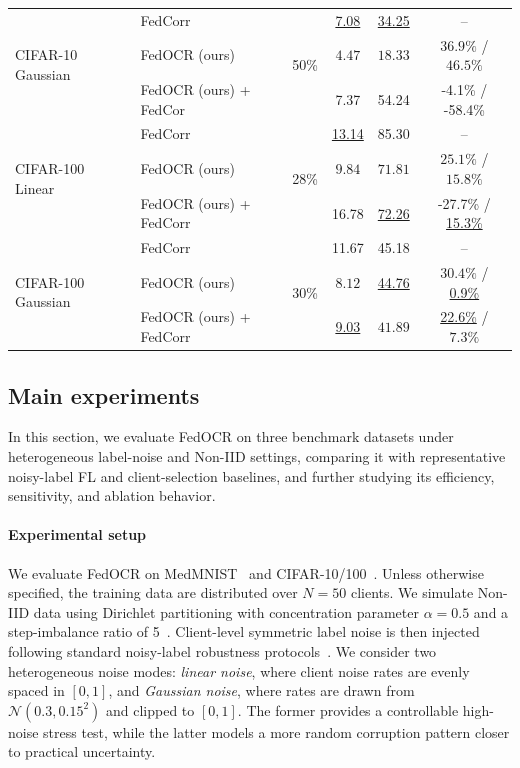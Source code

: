 ﻿\documentclass[conference]{IEEEtran}
\theoremstyle{definition}
\theoremstyle{remark}
\begin{document}
\begin{table}[!t]
\begin{tabular}{llcccc}
		\multirow{3}{*}{CIFAR-10 Gaussian} 
		& FedCorr & \multirow{3}{*}{50\%} & \underline{7.08} & \underline{34.25} & -- \\
		& FedOCR (ours) & & $\boldsymbol{4.47}$ & $\boldsymbol{18.33}$ & $\boldsymbol{36.9\%}$ / $\boldsymbol{46.5\%}$ \\
		& FedOCR (ours) + FedCor & & 7.37 & 54.24 & -4.1\% / -58.4\% \\
		\midrule
		
		\multirow{3}{*}{CIFAR-100 Linear} 
		& FedCorr & \multirow{3}{*}{28\%} & \underline{13.14} & 85.30 & -- \\
		& FedOCR (ours) & & $\boldsymbol{9.84}$ & $\boldsymbol{71.81}$ & $\boldsymbol{25.1\%}$ / $\boldsymbol{15.8\%}$ \\
		& FedOCR (ours) + FedCorr & & 16.78 & \underline{72.26} & -27.7\% / \underline{15.3\%} \\
		\midrule
		
		\multirow{3}{*}{CIFAR-100 Gaussian} 
		& FedCorr & \multirow{3}{*}{30\%} & 11.67 & 45.18 & -- \\
		& FedOCR (ours) & & $\boldsymbol{8.12}$ & \underline{44.76} & $\boldsymbol{30.4\%}$ / \underline{0.9\%} \\
		& FedOCR (ours) + FedCorr & & \underline{9.03} & $\boldsymbol{41.89}$ & \underline{22.6\%} / $\boldsymbol{7.3\%}$ \\
		\bottomrule
	\end{tabular}
\end{table}

\subsection{Main experiments}
\label{subsec:exp_setup}
In this section, we evaluate FedOCR on three benchmark datasets under heterogeneous label-noise and Non-IID settings, comparing it with representative noisy-label FL and client-selection baselines, and further studying its efficiency, sensitivity, and ablation behavior.	
\paragraph{\textbf{Experimental setup}}
We evaluate FedOCR on MedMNIST~\cite{yang2023medmnist} and CIFAR-10/100~\cite{krizhevsky2009learning}. 
Unless otherwise specified, the training data are distributed over $N=50$ clients. 
We simulate Non-IID data using Dirichlet partitioning with concentration parameter $\alpha=0.5$ and a step-imbalance ratio of 5~\cite{hsu2019measuring,li2021silos,zhu2021survey}. 
Client-level symmetric label noise is then injected following standard noisy-label robustness protocols~\cite{natarajan2013learning,patrini2017loss,liang2023fednoisy}. 
We consider two heterogeneous noise modes: \textit{linear noise}, where client noise rates are evenly spaced in $[0,1]$, and \textit{Gaussian noise}, where rates are drawn from $\mathcal{N}(0.3,0.15^2)$ and clipped to $[0,1]$. 
The former provides a controllable high-noise stress test, while the latter models a more random corruption pattern closer to practical uncertainty.
\end{document}
